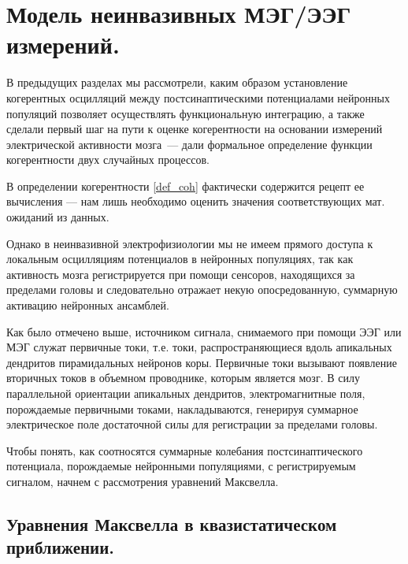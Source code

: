 

\section{Модель неинвазивных МЭГ/ЭЭГ измерений.}

В предыдущих разделах мы рассмотрели, каким образом установление когерентных
осцилляций между постсинаптическими потенциалами нейронных популяций позволяет
осуществлять функциональную интеграцию, а также сделали первый шаг на пути к
оценке когерентности на основании измерений электрической активности мозга~---
дали формальное определение функции когерентности двух случайных процессов.

В определении когерентности \ref{def_coh} фактически содержится рецепт ее
вычисления --- нам лишь необходимо оценить значения соответствующих мат.
ожиданий из данных.

Однако в неинвазивной электрофизиологии мы не имеем прямого доступа к локальным
осцилляциям потенциалов в нейронных популяциях, так как активность мозга
регистрируется при помощи сенсоров, находящихся за пределами головы и
следовательно отражает некую опосредованную, суммарную активацию нейронных ансамблей.

Как было отмечено выше, источником сигнала, снимаемого при помощи ЭЭГ или МЭГ
служат первичные токи, т.е. токи, распространяющиеся вдоль апикальных дендритов
пирамидальных нейронов коры.  Первичные токи вызывают появление вторичных токов
в объемном проводнике, которым является мозг.  В силу параллельной ориентации
апикальных дендритов, электромагнитные поля, порождаемые первичными токами,
накладываются, генерируя суммарное электрическое поле достаточной силы для
регистрации за пределами головы.

Чтобы понять, как соотносятся суммарные колебания постсинаптического
потенциала, порождаемые нейронными популяциями, с регистрируемым сигналом,
начнем с рассмотрения уравнений Максвелла.

\subsection{Уравнения Максвелла в квазистатическом приближении.}

